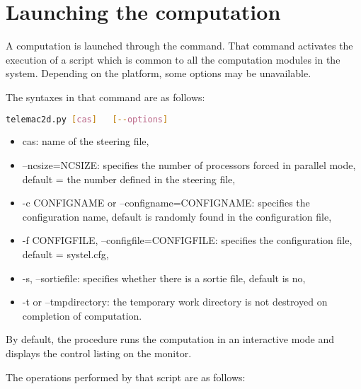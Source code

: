 \chapter{Launching the computation}
\label{tel2d:app1}

A computation is launched through the  command.
That command activates the execution of a script which is common to all the
computation modules in the \tel system.
Depending on the platform, some options may be unavailable.

The syntaxes in that command are as follows:

\begin{lstlisting}[language=bash]
telemac2d.py [cas]   [--options]
\end{lstlisting}

\begin{itemize}
\item cas: name of the steering file,

\item --ncsize=NCSIZE: specifies the number of processors forced in parallel
mode, default = the number defined in the steering file,

\item -c CONFIGNAME or --configname=CONFIGNAME: specifies the configuration
name, default is randomly found in the configuration file,

\item -f CONFIGFILE, --configfile=CONFIGFILE: specifies the configuration
file, default = systel.cfg,

\item -s, --sortiefile: specifies whether there is a sortie file, default is
no,

\item -t or --tmpdirectory: the temporary work directory is not destroyed on
completion of computation.
\end{itemize}

By default, the procedure runs the computation in an interactive mode and
displays the control listing on the monitor.

The operations performed by that script are as follows:

